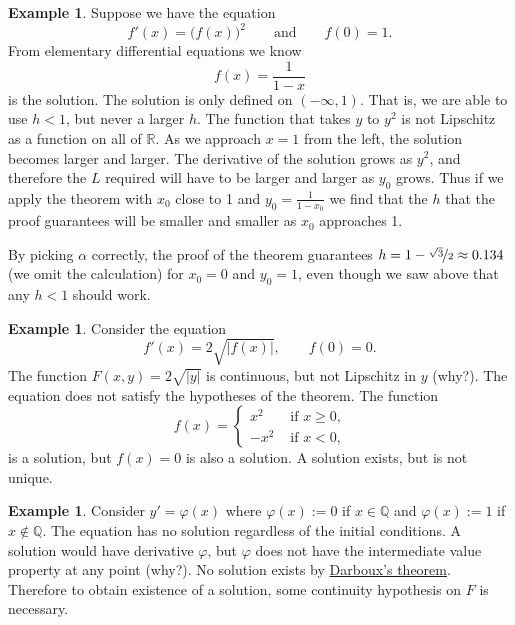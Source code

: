 \documentclass[12pt]{book}
\newcommand{\abs}[1]{\left\lvert {#1} \right\rvert}
\newcommand{\R}{{\mathbb{R}}}
\newcommand{\Q}{{\mathbb{Q}}}
\theoremstyle{plain}
\theoremstyle{remark}
\theoremstyle{definition}
\theoremstyle{exercise}
\theoremstyle{example}
\newtheorem{example}[thm]{Example}
\begin{document}
\begin{example}
Suppose we have the equation
\begin{equation*}
f'(x) = {\bigl(f(x)\bigr)}^2 \qquad \text{and} \qquad f(0)=1.
\end{equation*}
From elementary differential equations we know 
\begin{equation*}
f(x) = \frac{1}{1-x}
\end{equation*}
is the solution.
The solution is only defined on $(-\infty,1)$.  That is,
we are able to use $h < 1$, but never a larger $h$.
The function that takes $y$ to $y^2$ is
not Lipschitz as a function on all of $\R$.
As we approach $x=1$ from the left, the solution becomes larger
and larger.  The derivative of the solution grows as $y^2$, and therefore
the $L$ required will have to be larger and larger as $y_0$ grows.
Thus if we apply the
theorem with $x_0$ close to 1 and $y_0 = \frac{1}{1-x_0}$ we find
that the $h$ that the proof guarantees will be smaller and smaller as $x_0$
approaches 1.

By picking $\alpha$ correctly, the proof of the theorem guarantees
$h=1-\nicefrac{\sqrt{3}}{2} \approx 0.134$ (we omit the
calculation) for $x_0=0$ and $y_0=1$, even though
we saw above that any $h < 1$ should work.
\end{example}

\begin{example}
Consider the equation
\begin{equation*}
f'(x) = 2 \sqrt{\abs{f(x)}}, \qquad f(0) = 0 .
\end{equation*}
The function $F(x,y) = 2 \sqrt{\abs{y}}$ is continuous,
but not Lipschitz in $y$ (why?). 
The equation does not satisfy the hypotheses of the theorem.
The function
\begin{equation*}
f(x) =
\begin{cases}
x^2 & \text{ if $x \geq 0$,}\\
-x^2 & \text{ if $x < 0$,}
\end{cases}
\end{equation*}
is a solution, but $f(x) = 0$ is also a solution.
A solution exists, but is not unique.
\end{example}

\begin{example}
Consider $y' = \varphi(x)$ where $\varphi(x) := 0$ if $x \in \Q$ and
$\varphi(x):=1$ if $x
\not\in \Q$.  The equation has no solution regardless of the initial
conditions.
A solution would have
derivative $\varphi$, but $\varphi$ does not have the intermediate value property
at any point (why?).  No solution exists by
\hyperref[thm:darboux]{Darboux's theorem}.
Therefore to obtain existence of a solution, some continuity hypothesis on
$F$ is necessary.
\end{example}
\end{document}
